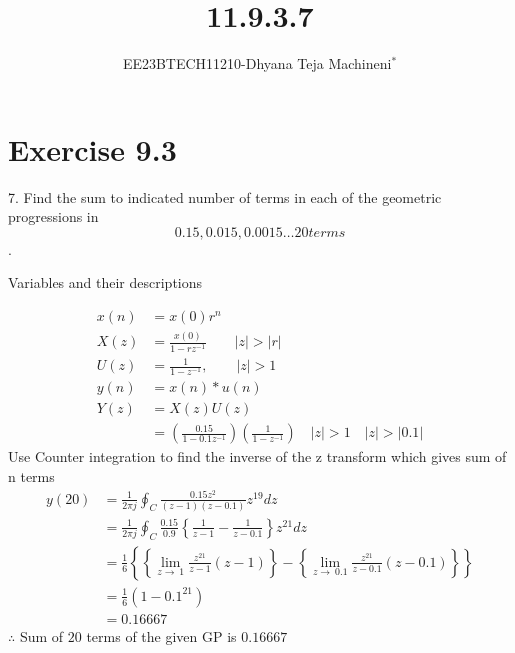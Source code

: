 \documentclass[journal,12pt,twocolumn]{IEEEtran}
\theoremstyle{remark}
\begin{document}

\vspace{3cm}
\title{\textbf{11.9.3.7}}
\author{EE23BTECH11210-Dhyana Teja Machineni$^{*}$%
}
\maketitle
\newpage
\bigskip

\section*{Exercise 9.3}
7. \hspace{2pt}Find the sum to indicated number of terms in each of the geometric progressions in
$$0.15, 0.015, 0.0015\ldots 20 terms$$.

\solution
\begin{flushleft}
     \begin{table}[h]
         \label{tab:table2}
         \caption{Variables and their descriptions}
         
     \end{table}
 \end{flushleft}
\begin{align}
x(n) &= x(0)r^n \\
X(z) &= \frac{x(0)}{1-rz^{-1}} \qquad |z| > |r| \\
U(z)&=\frac{1}{1-z^{-1}}, \qquad |z|>1\\
y(n)&= x(n)*u(n)\\
Y(z)&=X(z)U(z)\\
&=\left( \frac{0.15}{1-0.1z^{-1}}\right)\left(\frac{1}{1-z^{-1}}\right)\quad|z| > 1\quad|z|>|0.1|
\end{align}
Use Counter integration to find the inverse of the z transform which gives sum of n terms
\begin{align}
y(20)&=\frac{1}{2\pi j}\oint_C \frac{0.15 z^2}{(z-1)(z-0.1)}z^{19} dz\\
&=\frac{1}{2 \pi j}\oint_C \frac{0.15}{0.9} \left\{\frac{1}{z-1} - \frac{1}{z-0.1} \right\}z^{21}dz\\
&= \frac{1}{6} \left\{\left\{\lim_{z\to \ 1}\frac{z^{21}}{z-1} (z-1) \right\}-\left\{\lim_{z \to \ 0.1}\frac{z^{21}}{z-0.1} (z-0.1)\right\}\right\}\\
&= \frac{1}{6}(1- 0.1^{21})\\
    &=0.16667
\end{align}
        $\therefore$ Sum of $20$ terms of the given GP is $0.16667$
       \renewcommand{\thefigure}{\theenumi}
 \renewcommand{\thetable}{\theenumi}
\end{document}
